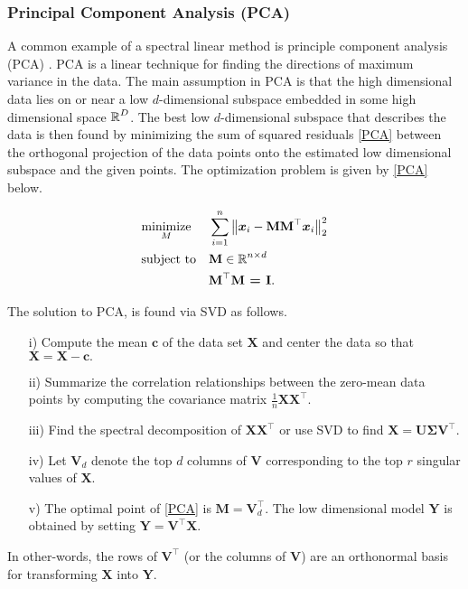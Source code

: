 \subsubsection{Principal Component Analysis (PCA)}
A common example of a spectral linear method is principle component analysis (PCA) \cite{JolliffeIT1986PCAa}. PCA is a linear technique for finding the directions of maximum variance in the data. The main assumption in PCA is that the high dimensional data lies on or near a low $d$-dimensional subspace embedded in some high dimensional space $\operatorname{\mathbb{R}}^{D}$. The best low $d$-dimensional subspace that describes the data is then found by minimizing the sum of squared residuals    \eqref{PCA} between the orthogonal projection of the data  points onto the estimated low dimensional subspace and the given points. The optimization problem
is given by \eqref{PCA} below.

\begin{equation}\label{PCA}
\begin{aligned}
& \underset{M}{\text{minimize}}
& & \sum_{i=1}^{n} \big \lVert \boldsymbol{x}_{i} - \textbf{MM}^{\top}\boldsymbol{x}_{i} \big \rVert_{2}^{2} \\
& \text{subject to}
& & \textbf{M} \in \operatorname{\mathbb{R}}^{n \times d} \\
&&& \textbf{M}^{\top}\textbf{M = I}.
\end{aligned}
\end{equation}

The solution to PCA, is found via SVD \cite{Agricultural1938, AmericanMathematicalSociety.1939Apat} as follows.
\begin{itemize}
\item[i)] Compute the mean $\textbf{c}$ of the data set $\textbf{X}$ and center
the data so that $\textbf{X} = \textbf{X} - \textbf{c}.$
\item[ii)] Summarize the correlation relationships between the zero-mean data points by computing the covariance matrix $\frac{1}{n}\textbf{XX}^{\top}.$
\item[iii)] Find the spectral decomposition of $\textbf{XX}^{\top}$ or 
use SVD to find $\textbf{X} = \bm{U\Sigma V^{\top}}.$
\item[iv)] Let $\bm{V}_{d}$ denote the top $d$ columns of $\textbf{V}$ corresponding to the  top $r$ singular values of $\textbf{X}$.
\item[v)] The optimal point of \eqref{PCA} is 
$\textbf{M} = \textbf{V}_{d}^{\top}$.
The low dimensional model $\textbf{Y}$ is obtained by setting $
\textbf{Y} = \textbf{V}^{\top}\textbf{X}$.
\end{itemize}
In other-words, the rows of $\textbf{V}^{\top}$ (or the columns of $\textbf{V}$) are an orthonormal basis for transforming $\textbf{X}$ into $\textbf{Y}$.\\


